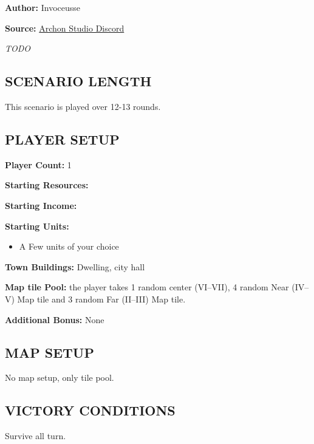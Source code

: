 
\begin{multicols*}{2}

\textbf{Author:} Invoceusse

\textbf{Source:} \href{https://discord.com/channels/740870068178649108/1262875465132146889}{Archon Studio Discord}

\textit{TODO}
\subsection*{\MakeUppercase{Scenario Length}}

This scenario is played over 12-13 rounds.

\subsection*{\MakeUppercase{Player setup}}

\textbf{Player Count:} 1

\textbf{Starting Resources:}\par
{}

\textbf{Starting Income:}\par
{}

\textbf{Starting Units:}
\begin{itemize}
  \item A Few  units of your choice
\end{itemize}

\textbf{Town Buildings:}  Dwelling, city hall

\textbf{Map tile Pool:} the player takes 1 random center (VI--VII), 4 random Near (IV--V) Map tile and 3 random Far (II--III) Map tile. 

\textbf{Additional Bonus:} None

\subsection*{\MakeUppercase{Map Setup}}

No map setup, only tile pool.

\subsection*{\MakeUppercase{Victory Conditions}}

Survive all turn.


\end{multicols*}
